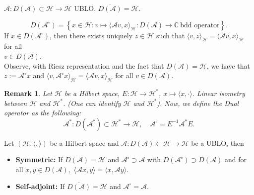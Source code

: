 \documentclass[12pt, oneside]{book}
\newtheorem{remark}{Remark}[section]
\begin{document}
$\mathscr{A}:D(\mathscr{A})\subset \mathscr{H}\to \mathscr{H}$ UBLO, $\overline{D(\mathscr{A})}=\mathscr{H}$.
\begin{definition}
\vspace{-2mm}
\[
D(\mathscr{A}^{\circ})=\left\{x\in \mathscr{H}:v\mapsto \langle \mathscr{A}v,x\rangle_{\mathscr{H}}: D(\mathscr{A})\rightarrow \mathbb{C}\ \text{bdd operator}\right\}.
\]
If $x\in D(\mathscr{A}^{\circ})$, then there exists uniquely $z\in \mathscr{H}$ such that $\langle v,z\rangle_{\mathscr{H}}=\langle\mathscr{A}v,x\rangle_{\mathscr{H}}$ for all \\$v\in D(\mathscr{A})$.\\
Observe, with Riesz representation and the fact that $\overline{D(\mathscr{A})}=\mathscr{H}$, we have that $z:=\mathscr{A}^{\circ}x$ and $\langle v,\mathscr{A}^{\circ}x\rangle_{\mathscr{H}}=\langle \mathscr{A}v,x\rangle_{\mathscr{H}}$ for all $v\in D(\mathscr{A})$.
\end{definition}
\begin{remark}
Let $\mathscr{H}$ be a Hilbert space,
$E:\mathscr{H}\to \mathscr{H}^*$,
$
x\mapsto\langle x,\cdot\rangle.
$
Linear isometry between $\mathscr{H}$ and $\mathscr{H}^*$. (One can identify $\mathscr{H}$ and $\mathscr{H}^*$). Now, we define the Dual operator as the following:
\vspace{-2mm}
\[
\mathscr{A}^*:D(\mathscr{A}^*)\subset \mathscr{H}^*\to \mathscr{H},\quad
\mathscr{A}^{\circ}=E^{-1}\mathscr{A}^*E.
\]	
\end{remark}
\begin{definition}
Let $(\mathscr{H},\langle,\rangle)$ be a Hilbert space and $\mathscr{A}: D(\mathscr{A})\subset \mathscr{H}\rightarrow \mathscr{H}$ be a UBLO, then
\begin{itemize}
	\item [1.] \textbf{Symmetric:} If $\overline{D(\mathscr{A})}=\mathscr{H}$ and $\mathscr{A}^{\circ}\supset \mathscr{A}$ with $D(\mathscr{A}^{\circ})\supset D(\mathscr{A})$ and for all $x,y\in D(\mathscr{A}),$ $\langle \mathscr{A}x,y\rangle=\langle x,\mathscr{A}y\rangle$.
	\item [2.] \textbf{Self-adjoint:} If $\overline{D(\mathscr{A})}=\mathscr{H}$ and $\mathscr{A}^{\circ}= \mathscr{A}$.
\end{itemize}	
\end{definition}
\end{document}
